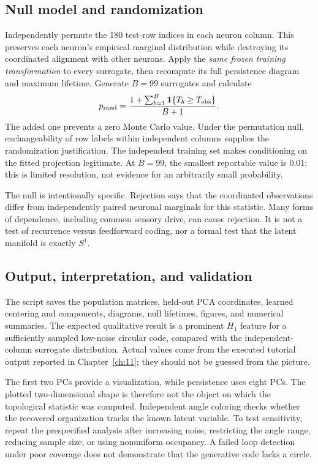 \subsection{Null model and randomization}
Independently permute the 180 test-row indices in each neuron column. This preserves each neuron's empirical marginal distribution while destroying its coordinated alignment with other neurons. Apply the \emph{same frozen training transformation} to every surrogate, then recompute its full persistence diagram and maximum lifetime. Generate $B=99$ surrogates and calculate
\begin{equation}
 p_{\rm rand}=\frac{1+\sum_{b=1}^{B}\mathbf1\{T_b\ge T_{\rm obs}\}}{B+1}.
 \label{eq:09-randomization}
\end{equation}
The added one prevents a zero Monte Carlo value. Under the permutation null, exchangeability of row labels within independent columns supplies the randomization justification. The independent training set makes conditioning on the fitted projection legitimate. At $B=99$, the smallest reportable value is $0.01$; this is limited resolution, not evidence for an arbitrarily small probability.

The null is intentionally specific. Rejection says that the coordinated observations differ from independently paired neuronal marginals for this statistic. Many forms of dependence, including common sensory drive, can cause rejection. It is not a test of recurrence versus feedforward coding, nor a formal test that the latent manifold is exactly $S^1$.

\subsection{Output, interpretation, and validation}
The script saves the population matrices, held-out PCA coordinates, learned centering and components, diagrams, null lifetimes, figures, and numerical summaries. The expected qualitative result is a prominent $H_1$ feature for a sufficiently sampled low-noise circular code, compared with the independent-column surrogate distribution. Actual values come from the executed tutorial output reported in Chapter~\ref{ch:11}; they should not be guessed from the picture.

The first two PCs provide a visualization, while persistence uses eight PCs. The plotted two-dimensional shape is therefore not the object on which the topological statistic was computed. Independent angle coloring checks whether the recovered organization tracks the known latent variable. To test sensitivity, repeat the prespecified analysis after increasing noise, restricting the angle range, reducing sample size, or using nonuniform occupancy. A failed loop detection under poor coverage does not demonstrate that the generative code lacks a circle.

